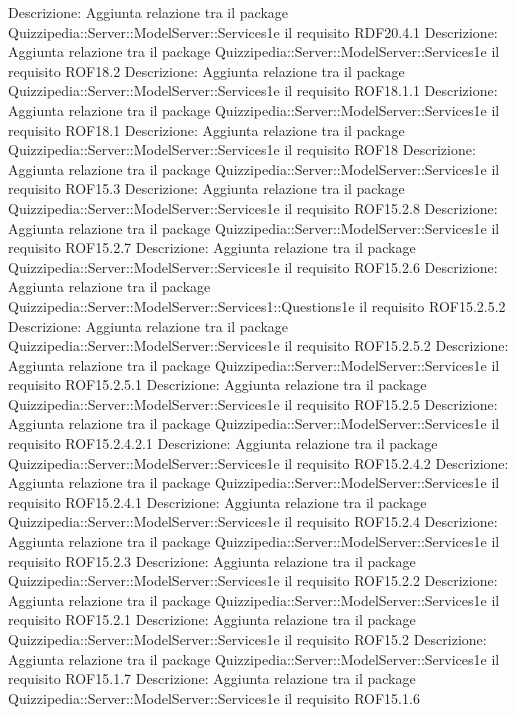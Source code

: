 Descrizione: Aggiunta relazione tra il package Quizzipedia::Server::ModelServer::Services1e il requisito RDF20.4.1 
Descrizione: Aggiunta relazione tra il package Quizzipedia::Server::ModelServer::Services1e il requisito ROF18.2 
Descrizione: Aggiunta relazione tra il package Quizzipedia::Server::ModelServer::Services1e il requisito ROF18.1.1 
Descrizione: Aggiunta relazione tra il package Quizzipedia::Server::ModelServer::Services1e il requisito ROF18.1 
Descrizione: Aggiunta relazione tra il package Quizzipedia::Server::ModelServer::Services1e il requisito ROF18 
Descrizione: Aggiunta relazione tra il package Quizzipedia::Server::ModelServer::Services1e il requisito ROF15.3 
Descrizione: Aggiunta relazione tra il package Quizzipedia::Server::ModelServer::Services1e il requisito ROF15.2.8 
Descrizione: Aggiunta relazione tra il package Quizzipedia::Server::ModelServer::Services1e il requisito ROF15.2.7 
Descrizione: Aggiunta relazione tra il package Quizzipedia::Server::ModelServer::Services1e il requisito ROF15.2.6 
Descrizione: Aggiunta relazione tra il package Quizzipedia::Server::ModelServer::Services1::Questions1e il requisito ROF15.2.5.2 
Descrizione: Aggiunta relazione tra il package Quizzipedia::Server::ModelServer::Services1e il requisito ROF15.2.5.2 
Descrizione: Aggiunta relazione tra il package Quizzipedia::Server::ModelServer::Services1e il requisito ROF15.2.5.1 
Descrizione: Aggiunta relazione tra il package Quizzipedia::Server::ModelServer::Services1e il requisito ROF15.2.5 
Descrizione: Aggiunta relazione tra il package Quizzipedia::Server::ModelServer::Services1e il requisito ROF15.2.4.2.1 
Descrizione: Aggiunta relazione tra il package Quizzipedia::Server::ModelServer::Services1e il requisito ROF15.2.4.2 
Descrizione: Aggiunta relazione tra il package Quizzipedia::Server::ModelServer::Services1e il requisito ROF15.2.4.1 
Descrizione: Aggiunta relazione tra il package Quizzipedia::Server::ModelServer::Services1e il requisito ROF15.2.4 
Descrizione: Aggiunta relazione tra il package Quizzipedia::Server::ModelServer::Services1e il requisito ROF15.2.3 
Descrizione: Aggiunta relazione tra il package Quizzipedia::Server::ModelServer::Services1e il requisito ROF15.2.2 
Descrizione: Aggiunta relazione tra il package Quizzipedia::Server::ModelServer::Services1e il requisito ROF15.2.1 
Descrizione: Aggiunta relazione tra il package Quizzipedia::Server::ModelServer::Services1e il requisito ROF15.2 
Descrizione: Aggiunta relazione tra il package Quizzipedia::Server::ModelServer::Services1e il requisito ROF15.1.7 
Descrizione: Aggiunta relazione tra il package Quizzipedia::Server::ModelServer::Services1e il requisito ROF15.1.6 
